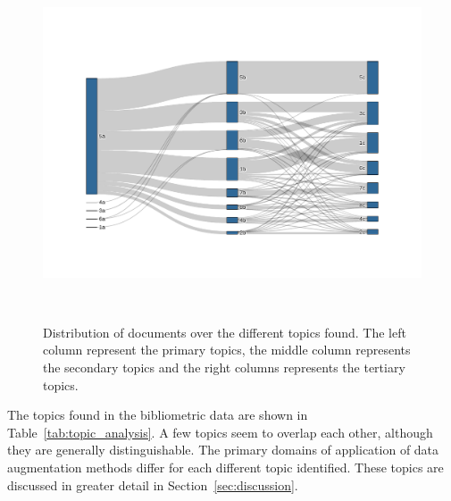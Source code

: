 \documentclass[parskip=full]{scrartcl}
\begin{document}
\begin{figure}[H]
	\centering
    \includegraphics[width=\linewidth]{../analysis/lda_topics_sankey}
    \caption{Distribution of documents over the different topics found. The
        left column represent the primary topics, the middle column represents
        the secondary topics and the right columns represents the tertiary
        topics.
    }~\label{fig:lda_topics_sankey}
\end{figure}

The topics found in the bibliometric data are shown in
Table~\ref{tab:topic_analysis}. A few topics seem to overlap each other,
although they are generally distinguishable. The primary domains of
application of data augmentation methods differ for each different topic
identified. These topics are discussed in greater detail in
Section~\ref{sec:discussion}.

\begin{table}[H]
    \centering
    \vspace{.2cm}
    \caption{\label{tab:topic_analysis}
        Description of the main topics found in the literature.
    }
\end{table}
\end{document}
